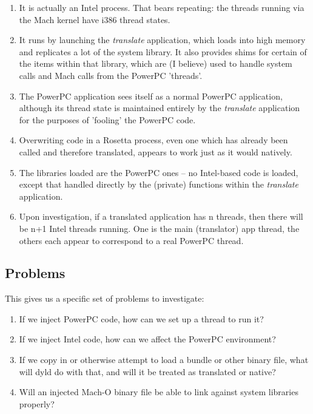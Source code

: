\documentclass[english]{article}
\begin{document}
\begin{enumerate}
  \item It is actually an Intel process. That bears repeating: the threads running via the Mach kernel have i386 thread states.
  \item It runs by launching the \textsl{translate} application, which loads into high memory and replicates a lot of the system library. It also provides shims for certain of the items within that library, which are (I believe) used to handle system calls and Mach calls from the PowerPC 'threads'.
  \item The PowerPC application sees itself as a normal PowerPC application, although its thread state is maintained entirely by the \textsl{translate} application for the purposes of 'fooling' the PowerPC code.
  \item Overwriting code in a Rosetta process, even one which has already been called and therefore translated, appears to work just as it would natively.
  \item The libraries loaded are the PowerPC ones -- no Intel-based code is loaded, except that handled directly by the (private) functions within the \textsl{translate} application.
  \item Upon investigation, if a translated application has n threads, then there will be n+1 Intel threads running. One is the main (translator) app thread, the others each appear to correspond to a real PowerPC thread.
\end{enumerate}

\subsection{Problems}

This gives us a specific set of problems to investigate:

\begin{enumerate}
  \item If we inject PowerPC code, how can we set up a thread to run it?
  \item If we inject Intel code, how can we affect the PowerPC environment?
  \item If we copy in or otherwise attempt to load a bundle or other binary file, what will dyld do with that, and will it be treated as translated or native?
  \item Will an injected Mach-O binary file be able to link against system libraries properly?
\end{enumerate}
\end{document}
